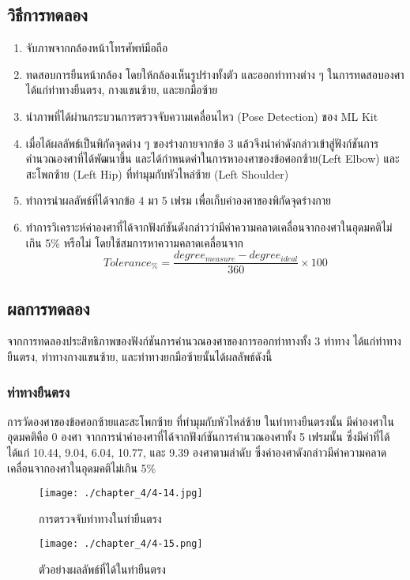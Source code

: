 \subsection{วิธีการทดลอง}
\begin{enumerate}
	\item จับภาพจากกล้องหน้าโทรศัพท์มือถือ
	\item ทดสอบการยืนหน้ากล้อง โดยให้กล้องเห็นรูปร่างทั้งตัว และออกท่าทางต่าง ๆ ในการทดสอบองศา ได้แก่ท่าทางยืนตรง, กางแขนซ้าย, และยกมือซ้าย
	\item นำภาพที่ได้ผ่านกระบวนการตรวจจับความเคลื่อนไหว (Pose Detection) ของ ML Kit
	\item เมื่อได้ผลลัพธ์เป็นพิกัดจุดต่าง ๆ ของร่างกายจากข้อ 3 แล้วจึงนำค่าดังกล่าวเข้าสู่ฟังก์ชันการคำนวณองศาที่ได้พัฒนาขึ้น และได้กำหนดค่าในการหาองศาของข้อศอกซ้าย(Left Elbow) และสะโพกซ้าย (Left Hip) ที่ทำมุมกับหัวไหล่ซ้าย (Left Shoulder)
	\item ทำการนำผลลัพธ์ที่ได้จากข้อ 4 มา 5 เฟรม เพื่อเก็บค่าองศาของพิกัดจุดร่างกาย
	\item ทำการวิเคราะห์ค่าองศาที่ได้จากฟังก์ชันดังกล่าวว่ามีค่าความคลาดเคลื่อนจากองศาในอุดมคติไม่เกิน 5\% หรือไม่ โดยใช้สมการหาความคลาดเคลื่อนจาก
	      \begin{equation}
		      Tolerance_\%=\frac{degree_{measure} - degree_{ideal}}{360} \times 100
	      \end{equation}
\end{enumerate}
\subsection{ผลการทดลอง}
จากการทดลองประสิทธิภาพของฟังก์ชันการคำนวณองศาของการออกท่าทางทั้ง 3 ท่าทาง ได้แก่ท่าทางยืนตรง, ท่าทางกางแขนซ้าย, และท่าทางยกมือซ้ายนั้นได้ผลลัพธ์ดังนี้
\subsubsection{ท่าทางยืนตรง}
การวัดองศาของข้อศอกซ้ายและสะโพกซ้าย ที่ทำมุมกับหัวไหล่ซ้าย ในท่าทางยืนตรงนั้น มีค่าองศาในอุดมคติคือ 0 องศา จากการนำค่าองศาที่ได้จากฟังก์ชันการคำนวณองศาทั้ง 5 เฟรมนั้น ซึ่งมีค่าที่ได้ ได้แก่ 10.44, 9.04, 6.04, 10.77, และ 9.39 องศาตามลำดับ ซึ่งค่าองศาดังกล่าวมีค่าความคลาดเคลื่อนจากองศาในอุดมคติไม่เกิน 5\%
\begin{figure}
	\texttt{[image: ./chapter\_4/4-14.jpg]}
	\caption{การตรวจจับท่าทางในท่ายืนตรง}
\end{figure}
\begin{figure}
	\texttt{[image: ./chapter\_4/4-15.png]}
	\caption{ตัวอย่างผลลัพธ์ที่ได้ในท่ายืนตรง}
\end{figure}

